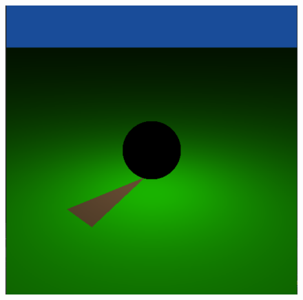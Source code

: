 \begin{figure}[H]
	\centering
	\includegraphics[scale=\imagescale]{images/worksheet_1/shading_of_diffuse_objects}
	\caption{}
	\label{fig:diffuse_shading}
\end{figure}